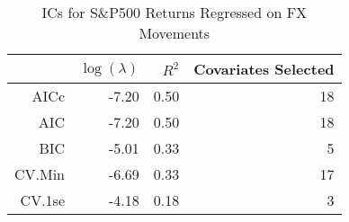 \begin{table}[ht]
\centering
\begin{tabular}{rrrr}
  \hline
 & $\log(\lambda)$ & $R^2$ & Covariates Selected \\ 
  \hline
AICc & -7.20 & 0.50 &  18 \\ 
  AIC & -7.20 & 0.50 &  18 \\ 
  BIC & -5.01 & 0.33 &   5 \\ 
  CV.Min & -6.69 & 0.33 &  17 \\ 
  CV.1se & -4.18 & 0.18 &   3 \\ 
   \hline
\end{tabular}
\caption{ICs for S\&P500 Returns Regressed on FX Movements} 
\label{tab:spregfx_ics}
\end{table}
